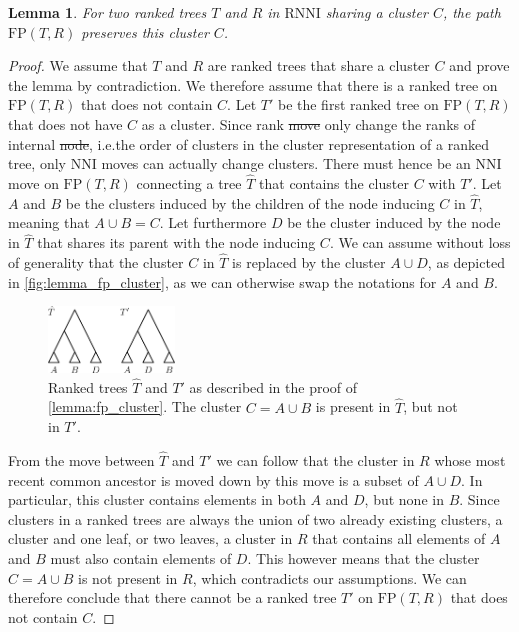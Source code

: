 \documentclass[11pt]{amsart}
\newtheorem{lemma}{Lemma}
\newcommand{\rnni}{\mathrm{RNNI}}
\newcommand{\nni}{\mathrm{NNI}}
\newcommand{\fp}{\mathrm{FP}}
\providecommand{\DIFaddtex}[1]{{\protect\color{blue}\uwave{#1}}} %
\providecommand{\DIFdeltex}[1]{{\protect\color{red}\sout{#1}}}                      %
\providecommand{\DIFaddbegin}{} %
\providecommand{\DIFaddend}{} %
\providecommand{\DIFdelbegin}{} %
\providecommand{\DIFdelend}{} %
\providecommand{\DIFadd}[1]{\texorpdfstring{\DIFaddtex{#1}}{#1}} %
\providecommand{\DIFdel}[1]{\texorpdfstring{\DIFdeltex{#1}}{}} %
\newcommand{\DIFscaledelfig}{0.5}
\newlength{\DIFdelgraphicswidth} %
\newlength{\DIFdelgraphicsheight} %
\newcommand{\DIFaddincludegraphics}[2][]{{\color{blue}\fbox{\DIFOincludegraphics[#1]{#2}}}} %
\newcommand{\DIFdelincludegraphics}[2][]{%
\sbox{\DIFdelgraphicsbox}{\DIFOincludegraphics[#1]{#2}}%
\settoboxwidth{\DIFdelgraphicswidth}{\DIFdelgraphicsbox} %
\settoboxtotalheight{\DIFdelgraphicsheight}{\DIFdelgraphicsbox} %
\scalebox{\DIFscaledelfig}{%
\parbox[b]{\DIFdelgraphicswidth}{\usebox{\DIFdelgraphicsbox}\\[-\baselineskip] \rule{\DIFdelgraphicswidth}{0em}}\llap{\resizebox{\DIFdelgraphicswidth}{\DIFdelgraphicsheight}{%
\setlength{\unitlength}{\DIFdelgraphicswidth}%
\begin{picture}(1,1)%
\thicklines\linethickness{2pt} %
{\color[rgb]{1,0,0}\put(0,0){\framebox(1,1){}}}%
{\color[rgb]{1,0,0}\put(0,0){\line( 1,1){1}}}%
{\color[rgb]{1,0,0}\put(0,1){\line(1,-1){1}}}%
\end{picture}%
}\hspace*{3pt}}} %
} %
\DeclareRobustCommand{\DIFaddbegin}{\DIFOaddbegin \let\includegraphics\DIFaddincludegraphics} %
\DeclareRobustCommand{\DIFaddend}{\DIFOaddend \let\includegraphics\DIFOincludegraphics} %
\DeclareRobustCommand{\DIFdelbegin}{\DIFOdelbegin \let\includegraphics\DIFdelincludegraphics} %
\DeclareRobustCommand{\DIFdelend}{\DIFOaddend \let\includegraphics\DIFOincludegraphics} %
\begin{document}
\begin{lemma}
	For two ranked trees $T$ and $R$ in $\rnni$ sharing a cluster $C$, the path $\fp(T,R)$ preserves this cluster $C$.
	\label{lemma:fp_cluster}
\end{lemma}

\begin{proof}
	We assume that $T$ and $R$ are ranked trees that share a cluster $C$ and prove the lemma by contradiction.
	We therefore assume that there is a ranked tree on $\fp(T,R)$ that does not contain $C$.
	Let $T'$ be the first ranked tree on $\fp(T,R)$ that does not have $C$ as a cluster.
	Since rank \DIFdelbegin \DIFdel{move }\DIFdelend \DIFaddbegin \DIFadd{moves }\DIFaddend only change the ranks of internal \DIFdelbegin \DIFdel{node}\DIFdelend \DIFaddbegin \DIFadd{nodes}\DIFaddend , i.e.\DIFaddbegin \DIFadd{\ }\DIFaddend the order of clusters in the cluster representation of a ranked tree, only $\nni$ moves can actually change clusters.
	There must hence be an $\nni$ move on $\fp(T,R)$ connecting a tree $\hat T$ that contains the cluster $C$ with $T'$.
	Let $A$ and $B$ be the clusters induced by the children of the node inducing $C$ in $\hat T$, meaning that $A \cup B = C$.
	Let furthermore $D$ be the cluster induced by the node in $\hat T$ that shares its parent with the node inducing $C$.
	We can assume without loss of generality that the cluster $C$ in $\hat T$ is replaced by the cluster $A \cup D$, as depicted in \autoref{fig:lemma_fp_cluster}, as we can otherwise swap the notations for $A$ and $B$.

	\begin{figure}[ht]
		\includegraphics[width=0.3\textwidth]{fp_cluster.eps}
		\caption{Ranked trees $\hat T$ and $T'$ as described in the proof of \autoref{lemma:fp_cluster}.
		The cluster $C = A \cup B$ is present in $\hat T$, but not in $T'$.}
		\label{fig:lemma_fp_cluster}
	\end{figure}

	From the move between $\hat T$ and $T'$ we can follow that the cluster in $R$ whose most recent common ancestor is moved down by this move is a subset of $A \cup D$.
	In particular, this cluster contains elements in both $A$ and $D$, but none in $B$.
	Since clusters in a ranked trees are always the union of two already existing clusters, a cluster and one leaf, or two leaves, a cluster in $R$ that contains all elements of $A$ and $B$ must also contain elements of $D$.
	This however means that the cluster $C = A \cup B$ is not present in $R$, which contradicts our assumptions.
	We can therefore conclude that there cannot be a ranked tree $T'$ on $\fp(T,R)$ that does not contain $C$.
\end{proof}
\end{document}
